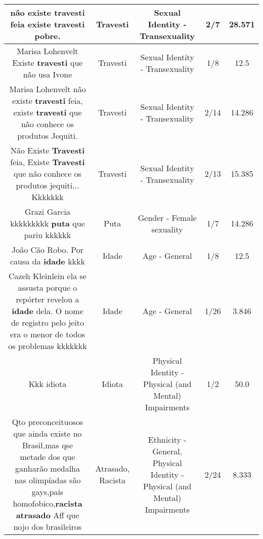 \documentclass[11pt]{article}
\newlength\mylength
\begin{document}
\begin{center}
\begin{longtable}{|C{.65\mylength}|C{.30\mylength}|C{.12\mylength}|C{.12\mylength}|C{.12\mylength}|}
  \small não existe \textbf{travesti} feia existe \textbf{travesti} pobre.\normalsize   & Travesti & Sexual Identity - Transexuality & 2/7 & 28.571 \\  \hline
  \small Marisa Lohenvelt Existe \textbf{travesti} que não usa Ivone\normalsize   & Travesti & Sexual Identity - Transexuality & 1/8 & 12.5 \\  \hline
  \small Marisa Lohenvelt não existe \textbf{travesti} feia, existe \textbf{travesti} que não conhece os produtos Jequiti.\normalsize   & Travesti & Sexual Identity - Transexuality & 2/14 & 14.286 \\  \hline
  \small Não Existe \textbf{Travesti} feia, Existe \textbf{Travesti} que não conhece os produtos jequiti... Kkkkkkk\normalsize   & Travesti & Sexual Identity - Transexuality & 2/13 & 15.385 \\  \hline
  \small Grazi Garcia kkkkkkkkk \textbf{puta} que pariu kkkkkk\normalsize   & Puta & Gender - Female sexuality & 1/7 & 14.286 \\  \hline
  \small João Cão Robo. Por causa da \textbf{idade} kkkk\normalsize   & Idade & Age - General & 1/8 & 12.5 \\  \hline
  \small Cazeh Kleinlein ela se assusta porque o repórter revelou a \textbf{idade} dela. O nome de registro pelo jeito era o menor de todos os problemas kkkkkkk\normalsize   & Idade & Age - General & 1/26 & 3.846 \\  \hline
  \small Kkk idiota\normalsize   & Idiota & Physical Identity - Physical (and Mental) Impairments & 1/2 & 50.0 \\  \hline
  \small Qto preconceituosos que ainda existe no Brasil,mas qse metade dos que ganharão medalha nas olimpíadas são gays,país homofobico,\textbf{racista} \textbf{atrasado} Aff que nojo dos brasileiros\normalsize   & Atrasado, Racista & Ethnicity - General, Physical Identity - Physical (and Mental) Impairments & 2/24 & 8.333 \\  \hline

\end{longtable}
\end{center}
\end{document}
